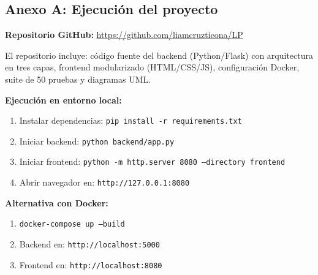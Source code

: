 \documentclass[12pt,a4paper]{article}
\begin{document}
\subsection{Anexo A: Ejecución del proyecto}

\textbf{Repositorio GitHub:} \url{https://github.com/liamcruzticona/LP}

El repositorio incluye: código fuente del backend (Python/Flask) con arquitectura en tres capas, frontend modularizado (HTML/CSS/JS), configuración Docker, suite de 50 pruebas y diagramas UML.

\vspace{0.5cm}

\textbf{Ejecución en entorno local:}
\begin{enumerate}
    \item Instalar dependencias: \texttt{pip install -r requirements.txt}
    \item Iniciar backend: \texttt{python backend/app.py}
    \item Iniciar frontend: \texttt{python -m http.server 8080 --directory frontend}
    \item Abrir navegador en: \texttt{http://127.0.0.1:8080}
\end{enumerate}

\textbf{Alternativa con Docker:}
\begin{enumerate}
    \item \texttt{docker-compose up --build}
    \item Backend en: \texttt{http://localhost:5000}
    \item Frontend en: \texttt{http://localhost:8080}
\end{enumerate}
\end{document}

